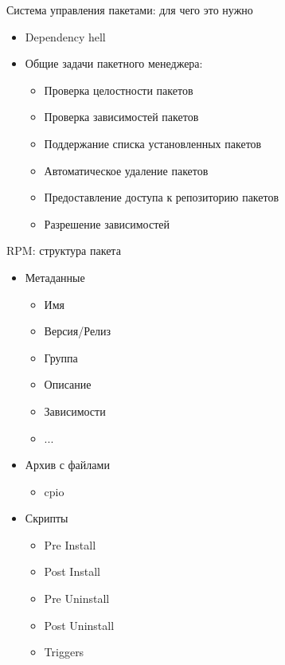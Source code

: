 \begin{frame}{Система управления пакетами: для чего это нужно}
\begin{itemize}
 \item Dependency hell
 \item Общие задачи пакетного менеджера:
   \begin{itemize}
     \item Проверка целостности пакетов
     \item Проверка зависимостей пакетов
        \item Поддержание списка установленных пакетов
        \item Автоматическое удаление пакетов
     \item Предоставление доступа к репозиторию пакетов
     \item Разрешение зависимостей
   \end{itemize}
\end{itemize}
\end{frame}


\begin{frame}{RPM: структура пакета}
	\begin{itemize}
		\item Метаданные
			\begin{itemize}
				\item Имя
				\item Версия/Релиз
				\item Группа
				\item Описание
                                \item Зависимости
				\item ...
			\end{itemize}
		\item Архив с файлами
			\begin{itemize}
				\item cpio
			\end{itemize}
		\item Скрипты
			\begin{itemize}
				\item Pre Install
				\item Post Install
				\item Pre Uninstall
				\item Post Uninstall \bigskip
				\item Triggers
			\end{itemize}
	\end{itemize}
\end{frame}

